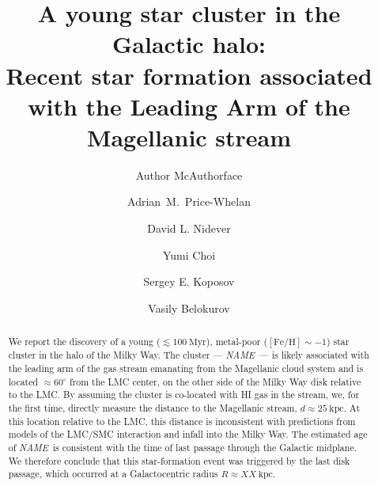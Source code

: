 \documentclass[modern]{aastex62}
\newcommand{\kpc}{\textrm{kpc}}
\newcommand{\clustername}{\textsl{NAME}}
\begin{document}
\title{A young star cluster in the Galactic halo: \\
Recent star formation associated with the Leading Arm of the Magellanic stream}

\author{Author McAuthorface}

\author[0000-0003-0872-7098]{Adrian~M.~Price-Whelan}

\author[0000-0002-1793-3689]{David L. Nidever}

\author[0000-0003-1680-1884]{Yumi Choi}

\author{Sergey E. Koposov}

\author{Vasily Belokurov}


\begin{abstract}

We report the discovery of a young ($\lesssim 100~\textrm{Myr}$), metal-poor ($[\textrm{Fe}/\textrm{H}] \sim -1$) star cluster in the halo of the Milky Way.
The cluster --- \clustername\ --- is likely associated with the leading arm of the gas stream emanating from the Magellanic cloud system and is located $\approx 60^\circ$ from the LMC center, on the other side of the Milky Way disk relative to the LMC.
By assuming the cluster is co-located with HI gas in the stream, we, for the first time, directly measure the distance to the Magellanic stream, $d \approx 25~\textrm{kpc}$.
At this location relative to the LMC, this distance is inconsistent with predictions from models of the LMC/SMC interaction and infall into the Milky Way.
The estimated age of \clustername\ is consistent with the time of last passage through the Galactic midplane.
We therefore conclude that this star-formation event was triggered by the last disk passage, which occurred at a Galactocentric radius $R \approx XX~\kpc$.

\end{abstract}
\end{document}
